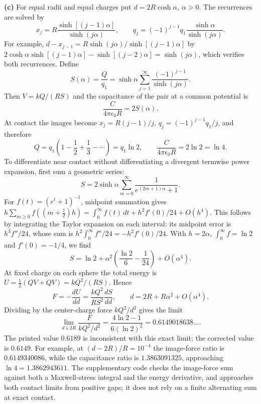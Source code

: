 \textbf{(c)} For equal radii and equal charges put
$d=2R\cosh\alpha$, $\alpha>0$. The recurrences are solved by
\[
x_j=R\frac{\sinh[(j-1)\alpha]}{\sinh(j\alpha)},\qquad
q_j=(-1)^{j-1}q_1\frac{\sinh\alpha}{\sinh(j\alpha)}.
\]
For example,
$d-x_{j-1}=R\sinh(j\alpha)/\sinh[(j-1)\alpha]$
by $2\cosh\alpha\sinh[(j-1)\alpha]-\sinh[(j-2)\alpha]
=\sinh(j\alpha)$, which verifies both recurrences. Define
\[
S(\alpha)=\frac Q{q_1}
=\sinh\alpha\sum_{j=1}^{\infty}\frac{(-1)^{j-1}}{\sinh(j\alpha)}.
\]
Then $V=kQ/(RS)$ and the capacitance of the pair at a common
potential is
\[
\frac{C}{4\pi\epsilon _0R}=2S(\alpha).
\]
At contact the images become
$x_j=R(j-1)/j$, $q_j=(-1)^{j-1}q_1/j$, and therefore
\[
Q=q_1\left(1-\frac12+\frac13-\cdots\right)=q_1\ln2,
\qquad \boxed{\frac{C}{4\pi\epsilon _0R}=2\ln2=\ln4}.
\]
To differentiate near contact without differentiating a divergent
termwise power expansion, first sum a geometric series:
\[
S=2\sinh\alpha\sum_{m=0}^{\infty}\frac1{e^{(2m+1)\alpha}+1}.
\]
For $f(t)=(e^t+1)^{-1}$, midpoint summation gives
$h\sum_{m\geq0}f((m+\tfrac12)h)
=\int_0^\infty f(t)\,dt+h^2f'(0)/24+O(h^4)$.
This follows by integrating the Taylor expansion on each interval:
its midpoint error is $h^3f''/24$, whose sum is
$h^2\int_0^\infty f''/24=-h^2f'(0)/24$.
With $h=2\alpha$, $\int_0^\infty f=\ln2$ and $f'(0)=-1/4$, we find
\[
S=\ln2+\alpha^2\left(\frac{\ln2}{6}-\frac1{24}\right)+O(\alpha^4).
\]
At fixed charge on each sphere the total energy is
$U=\tfrac12(QV+QV)=kQ^2/(RS)$. Hence
\[
F=-\frac{dU}{dd}=\frac{kQ^2}{RS^2}\frac{dS}{dd},\qquad
 d=2R+R\alpha^2+O(\alpha^4).
\]
Dividing by the center-charge force $kQ^2/d^2$ gives the limit
\[
\boxed{\lim_{d\downarrow2R}\frac{F}{kQ^2/d^2}
=\frac{4\ln2-1}{6(\ln2)^2}=0.6149018638\ldots.}
\]
The printed value $0.6189$ is inconsistent with this exact limit; the
corrected value is $0.6149$. For example, at $(d-2R)/R=10^{-4}$ the
image-force ratio is $0.6149340086$, while the capacitance ratio is
$1.3863091325$, approaching $\ln4=1.3862943611$.
The supplementary code checks the image-force sum against both a
Maxwell-stress integral and the energy derivative, and approaches
both contact limits from positive gaps;
it does not rely on a finite alternating sum at exact contact.

